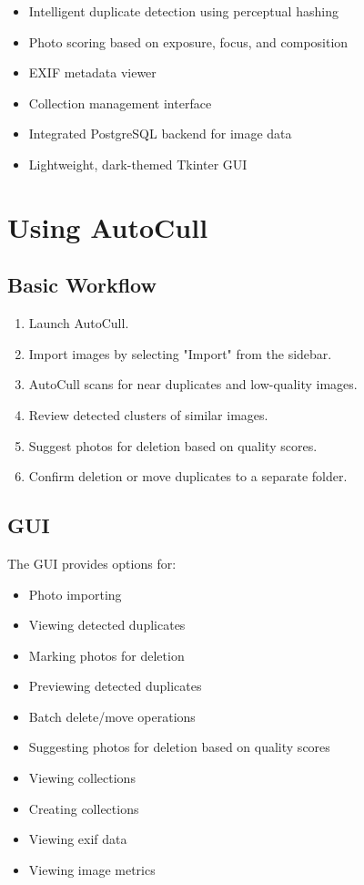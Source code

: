\documentclass[12pt,a4paper]{article}
\begin{document}
\begin{itemize}
    \item Intelligent duplicate detection using perceptual hashing
    \item Photo scoring based on exposure, focus, and composition
    \item EXIF metadata viewer
    \item Collection management interface
    \item Integrated PostgreSQL backend for image data
    \item Lightweight, dark-themed Tkinter GUI
\end{itemize}


\section{Using AutoCull}

\subsection{Basic Workflow}

\begin{enumerate}[label=\arabic*.]
    \item Launch AutoCull.
    \item Import images by selecting "Import" from the sidebar.
    \item AutoCull scans for near duplicates and low-quality images.
    \item Review detected clusters of similar images.
    \item Suggest photos for deletion based on quality scores.
    \item Confirm deletion or move duplicates to a separate folder.
\end{enumerate}

\subsection{GUI}
The GUI provides options for:
\begin{itemize}
    \item Photo importing
    \item Viewing detected duplicates
    \item Marking photos for deletion
    \item Previewing detected duplicates
    \item Batch delete/move operations
    \item Suggesting photos for deletion based on quality scores
    \item Viewing collections
    \item Creating collections
    \item Viewing exif data
    \item Viewing image metrics
\end{itemize}
\end{document}
